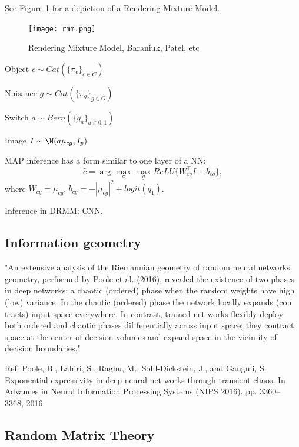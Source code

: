 \documentclass[english]{article}
\begin{document}
See Figure \ref{rmm} for a depiction of a Rendering Mixture Model.

\begin{figure}
  \centering
  \texttt{[image: rmm.png]}
  \caption{Rendering Mixture Model, Baraniuk, Patel, etc}
  \label{rmm}
\end{figure}

\bitem
\item Object $c \sim Cat(\{\pi_c\}_{c\in C})$
\item Nuisance $g \sim Cat(\{\pi_g\}_{g\in G})$
\item Switch $a \sim Bern(\{q_a\}_{a\in 0,1})$
\item Image $I \sim \N(a\mu_{cg},I_p)$ 
\eitem

\begin{theorem}
MAP inference has a form similar to one layer of a NN:  $$\hat c = \arg\max_c \max_g ReLU\{W_{cg}^\top I+b_{cg}\},$$
where $W_{cg} = \mu_{cg}$, $b_{cg}  = - |\mu_{cg}|^2+logit(q_1)$.
\end{theorem}

Inference in DRMM: CNN. 

\subsection{Information geometry}


\benum
\item "An extensive analysis of the Riemannian geometry of random neural networks  geometry, performed by Poole et al. (2016), revealed the existence of two phases in deep networks: a chaotic (ordered) phase
when the random weights have high (low) variance. In the
chaotic (ordered) phase the network locally expands (con
tracts) input space everywhere. In contrast, trained net
works flexibly deploy both ordered and chaotic phases dif
ferentially across input space; they contract space at the
center of decision volumes and expand space in the vicin
ity of decision boundaries." 

Ref: Poole, B., Lahiri, S., Raghu, M., Sohl-Dickstein, J., and
Ganguli, S. Exponential expressivity in deep neural net
works through transient chaos. In Advances in Neural
Information Processing Systems (NIPS 2016), pp. 3360–
3368, 2016.

\eenum

\subsection{Random Matrix Theory}
\end{document}
